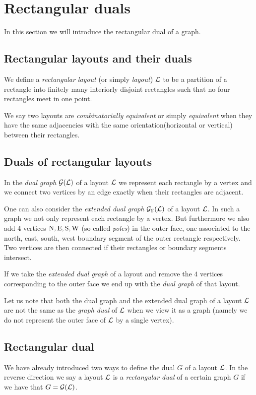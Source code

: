 
\section{Rectangular duals}
\newcommand{\G}{\scr G}
\renewcommand{\L}{\scr L}

In this section we will introduce the rectangular dual of a graph.

\subsection{Rectangular layouts and their duals}
  We define a \emph{rectangular layout} (or simply \emph{layout}) $\L$ to be a partition of a rectangle into finitely many interiorly disjoint rectangles such that no four rectangles meet in one point.

  We say two layouts are  \emph{combinatorially equivalent} or simply \emph{equivalent} when they have the same adjacencies with the same orientation(horizontal or vertical) between their rectangles.

\subsection{Duals of rectangular layouts}
  In the \emph{dual graph} $\dualgraph{\L}$ of a layout $\L$ we represent each rectangle by a vertex and we connect two vertices by an edge exactly when their rectangles are adjacent.

  One can also consider the \emph{extended dual graph} $\extdualgraph{\L}$ of a layout $\L$. In such a graph we not only represent each rectangle by a vertex. But furthermore we also add $4$ vertices $\mathrm{N}, \mathrm{E}, \mathrm{S}, \mathrm{W}$ (so-called \emph{poles}) in the outer face, one associated to the north, east, south, west boundary segment of the outer rectangle respectively. Two vertices are then connected if their rectangles or boundary segments intersect.

  If we take the \emph{extended dual graph} of a layout and remove the $4$ vertices corresponding to the outer face we end up with the \emph{dual graph} of that layout.

  Let us note that both the dual graph and the extended dual graph of a layout $\L$ are not the same as the \emph{graph dual} of $\L$ when we view it as a graph (namely we do not represent the outer face of $\L$ by a single vertex).

\subsection{Rectangular dual}
  We have already introduced two ways to define the dual $G$ of a layout $\L$. In the reverse direction we say a layout $\L$ is a \emph{rectangular dual} of a certain graph $G$ if we have that $G = \dualgraph{\L}$.

